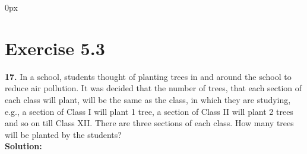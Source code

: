 \documentclass[journal,12pt,twocolumn]{IEEEtran}
\begin{document}
	\parindent 0px
	

 
	
	\title{}
	\author{EE23BTECH11209 - K S Ballvardhan$^{*}$
	}
	\maketitle
	\newpage
	\bigskip
	
	
	
	\section*{Exercise 5.3}
	
	\noindent \textbf{17.} In a school, students thought of planting trees in and around the school to reduce air pollution. It was decided that the number of trees, that each section of each class will plant, will be the same as the class, in which they are studying, e.g., a section of Class I will plant 1 tree, a section of Class II will plant 2 trees and so on till Class XII. There are three sections of each class. How many trees will be planted by the students?\\
	
        \textbf {Solution: }
	
\end{document}
